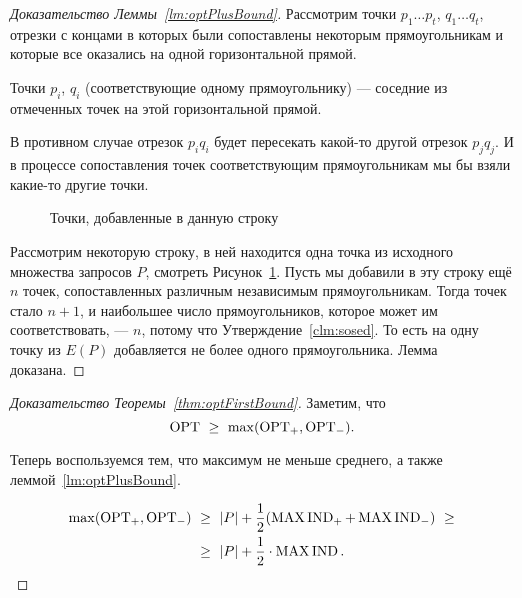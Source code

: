 \begin{proof}[Доказательство Леммы~\ref{lm:optPlusBound}]
Рассмотрим точки $p_1 \ldots p_t$, $q_1 \ldots q_t$, отрезки с концами в которых были сопоставлены некоторым прямоугольникам и которые все оказались на одной горизонтальной прямой.

\begin{clm} \label{clm:sosed}
	Точки $p_i$, $q_i$ (соответствующие одному прямоугольнику) — соседние из отмеченных точек на этой горизонтальной прямой.
\end{clm}

В противном случае отрезок $p_i q_i$ будет пересекать какой-то другой отрезок $p_j q_j$. И в процессе сопоставления точек соответствующим прямоугольникам мы бы взяли какие-то другие точки.

\begin{figure}[h] \centering
\caption{Точки, добавленные в данную строку}
\label{fig:nPoints}
\end{figure}

Рассмотрим некоторую строку, в ней находится одна точка из исходного множества запросов $P$, смотреть Рисунок~\ref{fig:nPoints}. Пусть мы добавили в эту строку ещё $n$ точек, сопоставленных различным независимым прямоугольникам. Тогда точек стало $n+1$, и наибольшее число прямоугольников, которое может им соответствовать, — $n$, потому что Утверждение~\ref{clm:sosed}. То есть на одну точку из $E(P)$ добавляется не более одного прямоугольника. Лемма доказана.
\end{proof}

\begin{proof}[Доказательство Теоремы~\ref{thm:optFirstBound}]
Заметим, что \[ \operatorname{OPT}\ \ge\ \max ( \operatorname{OPT}_+, \operatorname{OPT}_- ). \] \vspace{-8mm}

Теперь воспользуемся тем, что максимум не меньше среднего, а также леммой~\ref{lm:optPlusBound}. \vspace{-5mm}

\begin{align*}
	\max ( \operatorname{OPT}_+, \operatorname{OPT}_- )\ & \ge\ |P| + \frac{1}{2}
	( \operatorname{MAX\,IND}_+ + \operatorname{MAX\,IND}_- )\ \ge \\
	& \ge\ |P| + \frac{1}{2} \cdot \operatorname{MAX\,IND}.
\end{align*}

\vspace{-8mm} \end{proof}